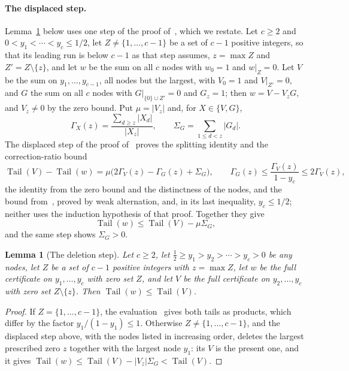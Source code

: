 \documentclass[11pt]{article}
\newtheorem{lemma}[theorem]{Lemma}
\theoremstyle{definition}
\theoremstyle{plain}
\DeclareMathOperator{\Tail}{Tail}
\begin{document}
\paragraph{The displaced step.}  Lemma~\ref{lem:delete}
below uses one step of the proof
of~\cite[Theorem~2.2]{coefficient-mass}, which we restate.  Let $c\ge2$ and
$0<y_1<\cdots<y_c\le1/2$, let $Z\ne\{1,\ldots,c-1\}$ be a set of $c-1$
positive integers, so that its leading run is below $c-1$ as that step
assumes, $z=\max Z$ and $Z'=Z\setminus\{z\}$, and let $w$ be the sum on all $c$
nodes with $w_0=1$ and $w|_Z=0$.  Let $V$ be the sum on
$y_1,\ldots,y_{c-1}$, all nodes but the largest, with $V_0=1$ and
$V|_{Z'}=0$, and $G$ the sum on all $c$ nodes with
$G|_{\{0\}\cup Z'}=0$ and $G_z=1$; then $w=V-V_zG$, and $V_z\ne0$ by the
zero bound.  Put $\mu=|V_z|$ and, for $X\in\{V,G\}$,
\[
  \Gamma_X(z)=\frac{\sum_{d\ge z}|X_d|}{|X_z|},
  \qquad \Sigma_G=\sum_{1\le d<z}|G_d| .
\]
The displaced step of the proof of~\cite[Theorem~2.2]{coefficient-mass}
proves the splitting identity and the correction-ratio bound
\[
  \Tail(V)-\Tail(w)=\mu\bigl(2\Gamma_V(z)-\Gamma_G(z)+\Sigma_G\bigr),
  \qquad
  \Gamma_G(z)\le\frac{\Gamma_V(z)}{1-y_c}\le2\Gamma_V(z),
\]
the identity from the zero bound and the distinctness of the nodes, and the
bound from~\cite[Lemma~2.3]{coefficient-mass}, proved by weak alternation,
and, in its last inequality, $y_c\le1/2$; neither uses the induction
hypothesis of that proof.
Together they give
\[
  \Tail(w)\le\Tail(V)-\mu\Sigma_G ,
\]
and the same step shows $\Sigma_G>0$.

\begin{lemma}[The deletion step]\label{lem:delete}
Let $c\ge2$, let $\tfrac12\ge y_1>y_2>\cdots>y_c>0$ be any nodes, let $Z$ be a set of $c-1$
positive integers with $z=\max Z$, let $w$ be the full certificate on
$y_1,\ldots,y_c$ with zero set $Z$, and let $V$ be the full certificate on
$y_2,\ldots,y_c$ with zero set $Z\setminus\{z\}$.  Then
$\Tail(w)\le\Tail(V)$.
\end{lemma}

\begin{proof}
If $Z=\{1,\ldots,c-1\}$, the evaluation~\cite[Lemma~2.1]{coefficient-mass} gives both tails as products, which
differ by the factor $y_1/(1-y_1)\le1$.  Otherwise
$Z\ne\{1,\ldots,c-1\}$, and the displaced step
above, with the nodes listed in increasing order, deletes
the largest prescribed zero $z$ together with the largest node $y_1$: its $V$
is the present one, and it gives
$\Tail(w)\le\Tail(V)-|V_z|\Sigma_G<\Tail(V)$.
\end{proof}
\end{document}

